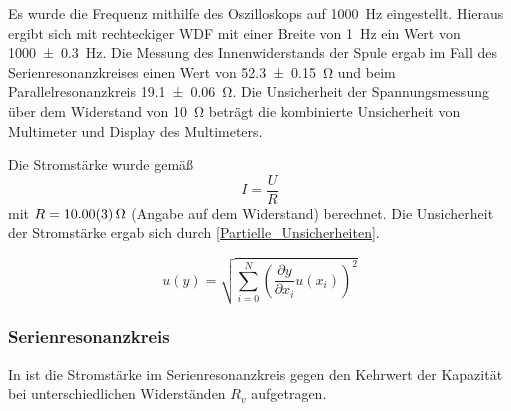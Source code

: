 \documentclass[
	a4paper,
	12pt,
	pagesize,
	ngerman
]{scrartcl}
\begin{document}
	Es wurde die Frequenz mithilfe des Oszilloskops auf \SI{1000}{\hertz} eingestellt.
	Hieraus ergibt sich mit rechteckiger WDF mit einer Breite von \SI{1}{\hertz} ein Wert von \SI{1000 \pm 0,3}{\hertz}.
	Die Messung des Innenwiderstands der Spule ergab im Fall des  Serienresonanzkreises einen Wert von  \SI{52,3 \pm 0,15}{\ohm} und beim Parallelresonanzkreis \SI{19,1 \pm 0,06}{\ohm}.
	Die Unsicherheit der Spannungsmessung über dem Widerstand von \SI{10}{\ohm} beträgt die kombinierte Unsicherheit von Multimeter und Display des Multimeters.
	\par
	Die Stromstärke wurde gemäß
	\begin{equation*}
		I=\frac{U}{R}
	\end{equation*}
	mit $ R=\SI{10 \pm 0,03}{\ohm} $ (Angabe auf dem Widerstand) berechnet.
	Die Unsicherheit der Stromstärke ergab sich durch \cref{Partielle_Unsicherheiten}.
	
	
	\begin{equation}
	u(y) = \sqrt{  \sum_{i=0}^{N} \left( \frac{\partial y}{\partial x_i}u(x_i)\right)^2  }
	\label{Partielle_Unsicherheiten}
	\end{equation}
	
	\subsubsection{Serienresonanzkreis}
	In  ist die Stromstärke im Serienresonanzkreis gegen den Kehrwert der Kapazität bei unterschiedlichen Widerständen $ R_v $ aufgetragen.
	
\end{document}
